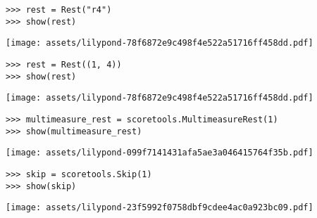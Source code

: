 \begin{abjadbookoutput}
\begin{singlespacing}
\vspace{-0.5\baselineskip}
\begin{lstlisting}
>>> rest = Rest("r4")
>>> show(rest)
\end{lstlisting}
\noindent\texttt{[image: assets/lilypond-78f6872e9c498f4e522a51716ff458dd.pdf]}
\end{singlespacing}
\end{abjadbookoutput}

\begin{comment}
<abjad>
rest = Rest((1, 4))
show(rest)
</abjad>
\end{comment}

\begin{abjadbookoutput}
\begin{singlespacing}
\vspace{-0.5\baselineskip}
\begin{lstlisting}
>>> rest = Rest((1, 4))
>>> show(rest)
\end{lstlisting}
\noindent\texttt{[image: assets/lilypond-78f6872e9c498f4e522a51716ff458dd.pdf]}
\end{singlespacing}
\end{abjadbookoutput}

\begin{comment}
<abjad>
multimeasure_rest = scoretools.MultimeasureRest(1)
show(multimeasure_rest)
</abjad>
\end{comment}

\begin{abjadbookoutput}
\begin{singlespacing}
\vspace{-0.5\baselineskip}
\begin{lstlisting}
>>> multimeasure_rest = scoretools.MultimeasureRest(1)
>>> show(multimeasure_rest)
\end{lstlisting}
\noindent\texttt{[image: assets/lilypond-099f7141431afa5ae3a046415764f35b.pdf]}
\end{singlespacing}
\end{abjadbookoutput}

\begin{comment}
<abjad>
skip = scoretools.Skip(1)
show(skip)
</abjad>
\end{comment}

\begin{abjadbookoutput}
\begin{singlespacing}
\vspace{-0.5\baselineskip}
\begin{lstlisting}
>>> skip = scoretools.Skip(1)
>>> show(skip)
\end{lstlisting}
\noindent\texttt{[image: assets/lilypond-23f5992f0758dbf9cdee4ac0a923bc09.pdf]}
\end{singlespacing}
\end{abjadbookoutput}

